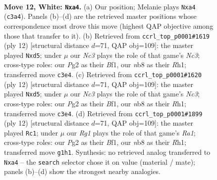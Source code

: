 \documentclass[11pt]{article}
\begin{document}
\clearpage

\begin{figure}[p]\centering
\begin{subfigure}{0.46\textwidth}\centering
\resizebox{\linewidth}{!}{%
\newchessgame
\chessboard[
  setfen={rnbqk2r/pp4b1/3p2p1/2p2p1p/n2P4/2N2N2/PPP1KPPP/R1BQ2R1 w kq - 0 12},
  showmover=false,
  pgfstyle=straightmove, color=movearrow, markmove={c3-a4}
]}
\caption{}
\end{subfigure}\hfill
\begin{subfigure}{0.46\textwidth}\centering
\resizebox{\linewidth}{!}{%
\newchessgame
\chessboard[
  setfen={rnbqk2r/pp2ppbp/6p1/2pn2B1/3P4/2N2N2/PP2PPPP/R2QKB1R w KQkq - 0 7},
  showmover=false,
  pgfstyle=straightmove, color=movearrow, markmove={c3-d5}
]}
\caption{}
\end{subfigure}
\\[4pt]
\begin{subfigure}{0.46\textwidth}\centering
\resizebox{\linewidth}{!}{%
\newchessgame
\chessboard[
  setfen={rnbqk2r/pp2ppbp/6p1/2pn2B1/3P4/2N2N2/PP2PPPP/R2QKB1R w KQkq - 0 7},
  showmover=false,
  pgfstyle=straightmove, color=movearrow, markmove={c3-d5}
]}
\caption{}
\end{subfigure}\hfill
\begin{subfigure}{0.46\textwidth}\centering
\resizebox{\linewidth}{!}{%
\newchessgame
\chessboard[
  setfen={rnbqk2r/pp2ppbp/6p1/2pn2B1/3P4/2N2N2/PP2PPPP/R2QKB1R w KQkq - 0 7},
  showmover=false,
  pgfstyle=straightmove, color=movearrow, markmove={a1-c1}
]}
\caption{}
\end{subfigure}
\caption{\textbf{Move 12, White: \texttt{Nxa4}.} (a) Our position; Melanie plays \texttt{Nxa4} (\texttt{c3a4}). Panels (b)--(d) are the retrieved master positions whose correspondence most drove this move (highest QAP objective among those that transfer to it). (b) Retrieved from \texttt{ccrl\_top\_p0001\#1619} (ply 12) [structural distance $d$=71, QAP obj=109]: the master played \texttt{Nxd5}; under $\mu$ our \emph{Nc3} plays the role of that game's \emph{Nc3}; cross-type roles: our \emph{P}g2 as their \emph{B}f1, our \emph{n}b8 as their \emph{R}h1; transferred move \texttt{c3e4}. (c) Retrieved from \texttt{ccrl\_top\_p0001\#1620} (ply 12) [structural distance $d$=71, QAP obj=109]: the master played \texttt{Nxd5}; under $\mu$ our \emph{Nc3} plays the role of that game's \emph{Nc3}; cross-type roles: our \emph{P}g2 as their \emph{B}f1, our \emph{n}b8 as their \emph{R}h1; transferred move \texttt{c3e4}. (d) Retrieved from \texttt{ccrl\_top\_p0001\#1899} (ply 12) [structural distance $d$=71, QAP obj=109]: the master played \texttt{Rc1}; under $\mu$ our \emph{Rg1} plays the role of that game's \emph{Ra1}; cross-type roles: our \emph{P}g2 as their \emph{B}f1, our \emph{n}b8 as their \emph{R}h1; transferred move \texttt{g1h1}. Synthesis: no retrieved analog transferred to \texttt{Nxa4} -- the \texttt{search} selector chose it on value (material / mate); panels (b)--(d) show the strongest nearby analogies.}
\label{fig:thought-m22}
\end{figure}
\end{document}
